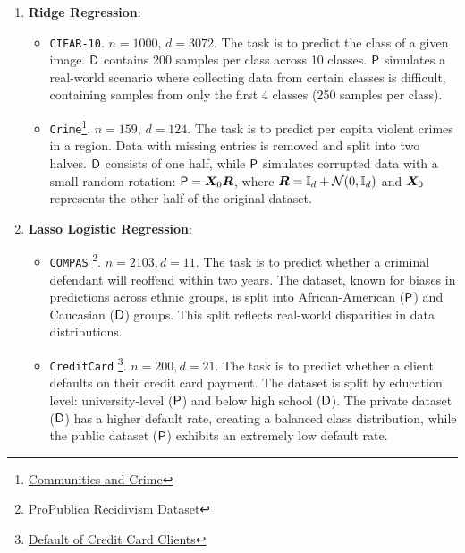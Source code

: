 \begin{enumerate}[itemsep=0mm]
    \item \textbf{Ridge Regression}:
    \begin{itemize}[itemsep=0mm]
        \item \texttt{CIFAR-10}. $n=1000$, $d = 3072$. The task is to predict the class of a given image. 
        ${\mathsf{D}}$ contains 200 samples per class across 10 classes.
        ${\mathsf{P}}$ simulates a real-world scenario where collecting data from certain classes is difficult, containing samples from only the first 4 classes (250 samples per class).
        \item \texttt{Crime}\footnote{\href{https://archive.ics.uci.edu/dataset/183/communities+and+crime}{Communities and Crime}}.
        $n = 159$, $d = 124$. The task is to predict per capita violent crimes in a region. Data with missing entries is removed and split into two halves. 
        ${\mathsf{D}}$ consists of one half, while ${\mathsf{P}}$ simulates corrupted data with a small random rotation: ${\mathsf{P}} = {\bm{X}}_0 {\bm{R}}$, where ${\bm{R}} = {\mathbb{I}}_d + {\mathcal{N}}(0, {\mathbb{I}}_d)$ and ${\bm{X}}_{0}$ represents the other half of the original dataset.
    \end{itemize}
    \item \textbf{Lasso Logistic Regression}:
    \begin{itemize}
        \item \texttt{COMPAS}
        \footnote{\href{https://raw.githubusercontent.com/propublica/compas-analysis/master/compas-scores-two-years.csv}{ProPublica Recidivism Dataset}}.
        $n= 2103, d = 11$. 
        The task is to predict whether a criminal defendant will reoffend within two years. The dataset, known for biases in predictions across ethnic groups, is split into African-American (${\mathsf{P}}$) and Caucasian (${\mathsf{D}}$) groups. This split reflects real-world disparities in data distributions.
         \item \texttt{CreditCard}
        \footnote{\href{https://archive.ics.uci.edu/dataset/350/default+of+credit+card+clients}{Default of Credit Card Clients}}.
        $n = 200, d = 21$. 
         The task is to predict whether a client defaults on their credit card payment. The dataset is split by education level: university-level (${\mathsf{P}}$) and below high school (${\mathsf{D}}$). 
         The private dataset (${\mathsf{D}}$) has a higher default rate, creating a balanced class distribution, while the public dataset (${\mathsf{P}}$) exhibits an extremely low default rate.
    \end{itemize}
\end{enumerate}


